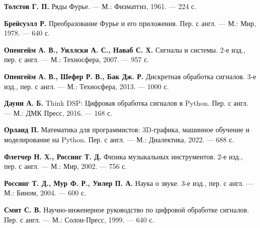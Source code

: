 \documentclass[bachelor, och, diploma]{SCWorks}
\begin{document}
\begin{thebibliography}{99}

\textbf{Толстов Г. П.} 
Ряды Фурье.  
--- М.: Физматгиз, 1961.  
--- 224 с.

\textbf{Брейсуэлл Р.} 
Преобразование Фурье и его приложения.  
Пер. с англ.  
--- М.: Мир, 1978.  
--- 640 с. 

\textbf{Опенгейм А. В., Уиллски А. С., Наваб С. Х.} 
Сигналы и системы.  
2-е изд., пер. с англ.  
--- М.: Техносфера, 2007.  
--- 957 с. 

\textbf{Опенгейм А. В., Шефер Р. В., Бак Дж. Р.} 
Дискретная обработка сигналов.  
3-е изд., пер. с англ.  
--- М.: Техносфера, 2013.  
--- 1000 с. 

\textbf{Дауни А. Б.} 
Think DSP: Цифровая обработка сигналов в Python.  
Пер. с англ.  
--- М.: ДМК Пресс, 2016.  
--- 168 с. 

\textbf{Орланд П.} 
Математика для программистов: 3D-графика, машинное обучение и моделирование на Python.  
Пер. с англ.  
--- М.: Диалектика, 2022.  
--- 688 с. 

\textbf{Флетчер Н. Х., Россинг Т. Д.} 
Физика музыкальных инструментов.  
2-е изд., пер. с англ.  
--- М.: Мир, 2002.  
--- 756 с. 

\textbf{Россинг Т. Д., Мур Ф. Р., Уилер П. А.} 
Наука о звуке.  
3-е изд., пер. с англ.  
--- М.: Бином, 2004.  
--- 600 с. 

\textbf{Смит С. В.} 
Научно-инженерное руководство по цифровой обработке сигналов.  
Пер. с англ.  
--- М.: Солон-Пресс, 1999.  
--- 640 с. 


\end{thebibliography}
\end{document}
